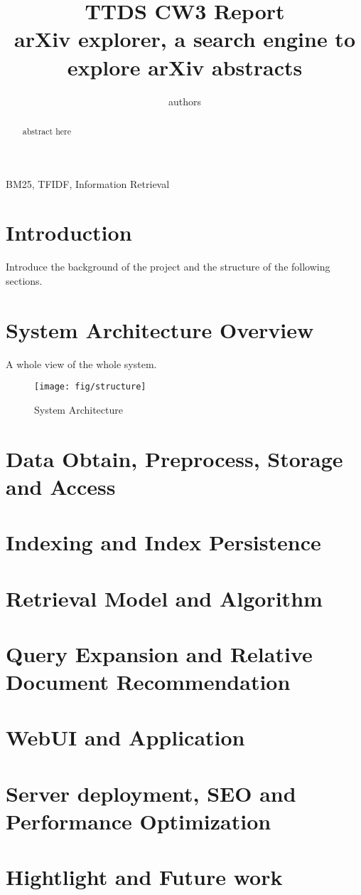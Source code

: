 \documentclass[conference]{IEEEtran}
\begin{document}
\title{TTDS CW3 Report\\
{arXiv explorer, a search engine to explore arXiv abstracts}}


\author{authors}

\maketitle

\begin{abstract}
abstract here
\end{abstract}

\begin{IEEEkeywords}
BM25, TFIDF, Information Retrieval
\end{IEEEkeywords}

\section{Introduction}
Introduce the background of the project and the structure of the following sections.
\section{System Architecture Overview}
A whole view of the whole system.
\begin{figure}[h]
\centering
\texttt{[image: fig/structure]} 
\caption{System Architecture}
\label{SystemArchitecture}
\end{figure}
\section{Data Obtain, Preprocess, Storage and Access}
\section{Indexing and Index Persistence}
\section{Retrieval Model and Algorithm}
\section{Query Expansion and Relative Document Recommendation}
\section{WebUI and Application}
\section{Server deployment, SEO and Performance Optimization}
\section{Hightlight and Future work}
\end{document}
